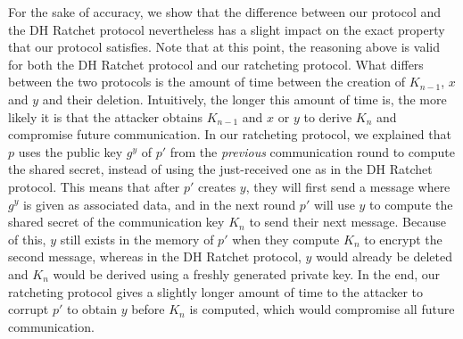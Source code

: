 For the sake of accuracy, we show that the difference between our protocol and the DH Ratchet protocol nevertheless has a slight impact on the exact property that our protocol satisfies.
Note that at this point, the reasoning above is valid for both the DH Ratchet protocol and our ratcheting protocol.
What differs between the two protocols is the amount of time between the creation of $K_{n-1}$, $x$ and $y$ and their deletion.
Intuitively, the longer this amount of time is, the more likely it is that the attacker obtains $K_{n-1}$ and $x$ or $y$ to derive $K_n$ and compromise future communication.
In our ratcheting protocol, we explained that $p$ uses the public key $g^y$ of $p'$ from the \emph{previous} communication round to compute the shared secret, instead of using the just-received one as in the DH Ratchet protocol.
This means that after $p'$ creates $y$, they will first send a message where $g^y$ is given as associated data, and in the next round $p'$ will use $y$ to compute the shared secret of the communication key $K_n$ to send their next message.
Because of this, $y$ still exists in the memory of $p'$ when they compute $K_n$ to encrypt the second message, whereas in the DH Ratchet protocol, $y$ would already be deleted and $K_n$ would be derived using a freshly generated private key.
In the end, our ratcheting protocol gives a slightly longer amount of time to the attacker to corrupt $p'$ to obtain $y$ before $K_n$ is computed, which would compromise all future communication.


